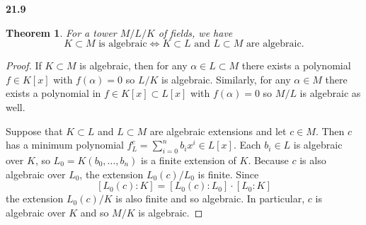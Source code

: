 \documentclass{article}
\theoremstyle{plain}
\newtheorem*{theorem*}{Theorem}
\theoremstyle{remark}
\newenvironment{colbox}[1]
    {\newcommand\colboxcolor{B6D0DE}%
    \begin{lrbox}{\selvestebox}%
    \begin{minipage}{\dimexpr\columnwidth-2\fboxsep\relax}\textbf{#1}}
    {\vspace{0.5em}\end{minipage}\end{lrbox}%
    \begin{center}
    \colorbox[HTML]{\colboxcolor}{\usebox{\selvestebox}}
    \end{center}}
\begin{document}
    \begin{colbox}{21.9}
        \begin{theorem*}
            For a tower $M/L/K$ of fields, we have
            $$ K\subset M\text{ is algebraic}\iff K\subset L\text{ and } L\subset M\text{ are algebraic}.$$
        \end{theorem*}
    \end{colbox}
    \begin{proof}
        If $K\subset M$ is algebraic, then for any $\alpha\in L\subset M$ there exists a polynomial $f\in K[x]$ with $f(\alpha)=0$ so $L/K$ is algebraic.
        Similarly, for any $\alpha\in M$ there exists a polynomial in $f\in K[x]\subset L[x]$ with $f(\alpha)=0$ so $M/L$ is algebraic as well.

        Suppose that $K\subset L$ and $L\subset M$ are algebraic extensions and let $c\in M$. 
        Then $c$ has a minimum polynomial $f_L^c=\sum_{i=0}^n b_ix^i\in L[x]$. 
        Each $b_i\in L$ is algebraic over $K$, so $L_0=K(b_0,\dots, b_n)$ is a finite extension of $K$. 
        Because $c$ is also algebraic over $L_0$, the extension $L_0(c)/L_0$ is finite. Since
        $$[L_0(c):K]=[L_0(c):L_0]\cdot [L_0: K]$$
        the extension $L_0(c)/K$ is also finite and so algebraic. In particular, $c$ is algebraic over $K$ and so $M/K$ is algebraic.
    \end{proof}
\end{document}
